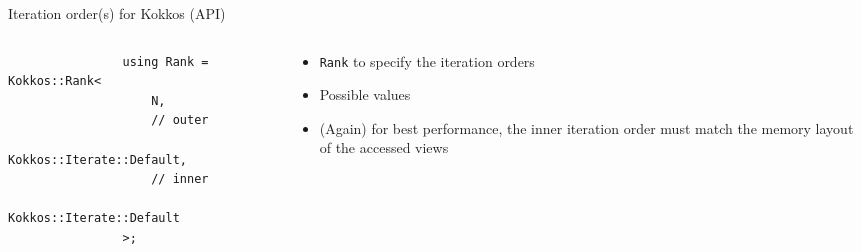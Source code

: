 \documentclass[
    aspectratio=169,
]{beamer}
\begin{document}
\begin{frame}[fragile]{Iteration order(s) for Kokkos (API)}
    \begin{columns}
        \begin{column}{0.5\linewidth}
            \begin{verbatim}
                using Rank = Kokkos::Rank<
                    N,
                    // outer
                    Kokkos::Iterate::Default,
                    // inner
                    Kokkos::Iterate::Default
                >;
            \end{verbatim}
        \end{column}
        \begin{column}{0.5\linewidth}
            \begin{itemize}
                \item \texttt{Rank} to specify the iteration orders
                \item Possible values
                \item (Again) for best performance, the inner iteration order must match the memory layout of the accessed views
            \end{itemize}
        \end{column}
    \end{columns}
\end{frame}
\end{document}
